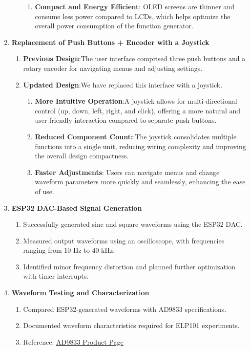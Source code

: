\documentclass[12pt,a4paper]{article}
\begin{document}
\begin{enumerate}
\begin{enumerate}
\begin{enumerate}
\item \textbf{Compact and Energy Efficient}:  OLED screens are thinner and consume less power compared to LCDs, which helps optimize the overall power consumption of the function generator.

\end{enumerate}
\end{enumerate}
\item \textbf{Replacement of Push Buttons + Encoder with a Joystick
}
\begin{enumerate}
\item \textbf{Previous Design}:The user interface comprised three push buttons and a rotary encoder for navigating menus and adjusting settings.  
\item \textbf{Updated Design}:We have replaced this interface with a joystick.


\begin{enumerate}
\item \textbf{More Intuitive Operation}:A joystick allows for multi-directional control (up, down, left, right, and click), offering a more natural and user-friendly interaction compared to separate push buttons.

\item \textbf{Reduced Component Count:}:The joystick consolidates multiple functions into a single unit, reducing wiring complexity and improving the overall design compactness.


\item \textbf{Faster Adjustments}: Users can navigate menus and change waveform parameters more quickly and seamlessly, enhancing the ease of use.

\end{enumerate}
\end{enumerate}

    \item \textbf{ESP32 DAC-Based Signal Generation}  
    \begin{enumerate}
        \item Successfully generated sine and square waveforms using the ESP32 DAC.
        \item Measured output waveforms using an oscilloscope, with frequencies ranging from 10 Hz to 40 kHz.
        \item Identified minor frequency distortion and planned further optimization with timer interrupts.
    \end{enumerate}
    
    \item \textbf{Waveform Testing and Characterization}  
    \begin{enumerate}
        \item Compared ESP32-generated waveforms with AD9833 specifications.
        \item Documented waveform characteristics required for ELP101 experiments.
        \item Reference: \href{https://www.analog.com/en/products/ad9833.html}{AD9833 Product Page}
    \end{enumerate}


\end{enumerate}
\end{document}
